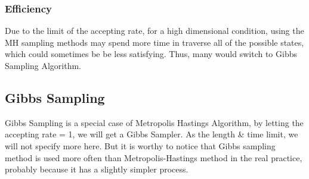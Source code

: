 \subsubsection{Efficiency}
Due to the limit of the accepting rate, for a high dimensional condition, using the MH sampling methods may spend more time in traverse all of the possible states, which could sometimes be be less satisfying. Thus, many would switch to Gibbs Sampling Algorithm.




\subsection{Gibbs Sampling}
Gibbs Sampling is a special case of Metropolis Hastings Algorithm, by letting the accepting rate = 1, we will get a Gibbs Sampler. As the length \& time limit, we will not specify more here.
But it is worthy to notice that Gibbs sampling method is used more often than Metropolis-Hastings method in the real practice, probably because it has a slightly simpler process.






